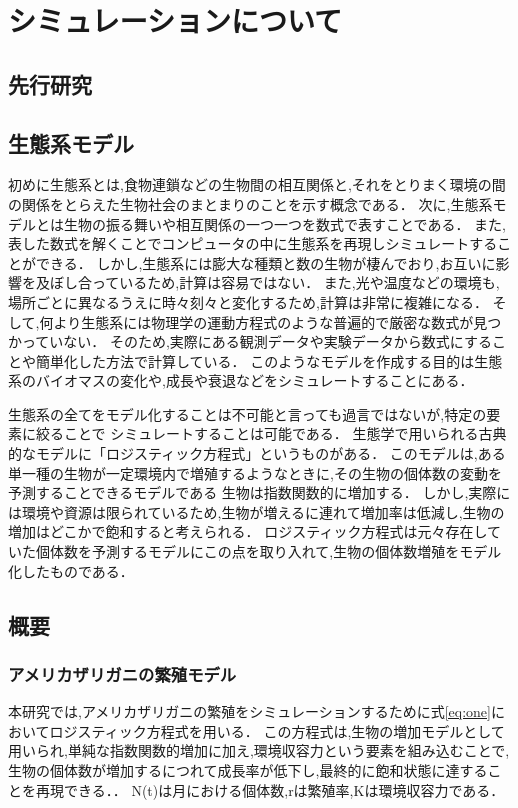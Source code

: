 \documentclass[12pt,a4j,titlepage]{ltjsarticle}
\begin{document}
\clearpage
\section{シミュレーションについて}

\subsection{先行研究}

\subsection{生態系モデル}
初めに生態系とは,食物連鎖などの生物間の相互関係と,それをとりまく環境の間の関係をとらえた生物社会のまとまりのことを示す概念である．
次に,生態系モデルとは生物の振る舞いや相互関係の一つ一つを数式で表すことである．
また,表した数式を解くことでコンピュータの中に生態系を再現しシミュレートすることができる．
しかし,生態系には膨大な種類と数の生物が棲んでおり,お互いに影響を及ぼし合っているため,計算は容易ではない．
また,光や温度などの環境も,場所ごとに異なるうえに時々刻々と変化するため,計算は非常に複雑になる．
そして,何より生態系には物理学の運動方程式のような普遍的で厳密な数式が見つかっていない．
そのため,実際にある観測データや実験データから数式にすることや簡単化した方法で計算している．
このようなモデルを作成する目的は生態系のバイオマスの変化や,成長や衰退などをシミュレートすることにある．

生態系の全てをモデル化することは不可能と言っても過言ではないが,特定の要素に絞ることで
シミュレートすることは可能である．
生態学で用いられる古典的なモデルに「ロジスティック方程式」というものがある．
このモデルは,ある単一種の生物が一定環境内で増殖するようなときに,その生物の個体数の変動を予測することできるモデルである
生物は指数関数的に増加する．
しかし,実際には環境や資源は限られているため,生物が増えるに連れて増加率は低減し,生物の増加はどこかで飽和すると考えられる．
ロジスティック方程式は元々存在していた個体数を予測するモデルにこの点を取り入れて,生物の個体数増殖をモデル化したものである．


\subsection{概要}
\subsubsection{アメリカザリガニの繁殖モデル}
本研究では,アメリカザリガニの繁殖をシミュレーションするために式\eqref{eq:one}においてロジスティック方程式を用いる．
この方程式は,生物の増加モデルとして用いられ,単純な指数関数的増加に加え,環境収容力という要素を組み込むことで,生物の個体数が増加するにつれて成長率が低下し,最終的に飽和状態に達することを再現できる．\cite{log}．
N(t)は月における個体数,rは繁殖率,Kは環境収容力である．
\end{document}
